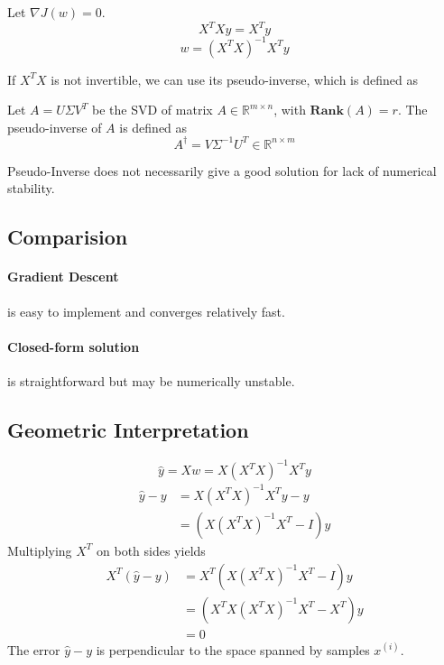 Let $\nabla J(w) = 0$.
\[ X^TXy = X^Ty \]
\[ w = (X^TX)^{-1}X^Ty \]
\begin{remark}
    If $X^TX$ is not invertible, we can use its pseudo-inverse, which is defined as
\end{remark}
\begin{definition}
    Let $A = U\Sigma V^T$ be the SVD of matrix $A \in \mathbb{R}^{m\times n}$, with $\mathbf{Rank}(A) = r$. The pseudo-inverse of $A$ is defined as
    \[ A^{\dagger} = V\Sigma^{-1}U^T \in \mathbb{R}^{n\times m} \]
\end{definition}
\begin{remark}
    Pseudo-Inverse does not necessarily give a good solution for lack of numerical stability.
\end{remark}
\subsection{Comparision}
\paragraph{Gradient Descent} is easy to implement and converges relatively fast.
\paragraph{Closed-form solution} is straightforward but may be numerically unstable.
\subsection{Geometric Interpretation}
\[ \hat{y} = Xw = X(X^TX)^{-1}X^Ty \]
\begin{align*}
    \hat{y} - y &= X(X^TX)^{-1}X^Ty - y \\
    &= (X(X^TX)^{-1}X^T - I)y
\end{align*}
Multiplying $X^T$ on both sides yields
\begin{align*}
    X^T(\hat{y}-y) &= X^T(X(X^TX)^{-1}X^T - I)y \\
    &= (X^TX(X^TX)^{-1}X^T - X^T)y \\
    &= 0
\end{align*}
The error $\hat{y} - y$ is perpendicular to the space spanned by samples $x^{(i)}$.
